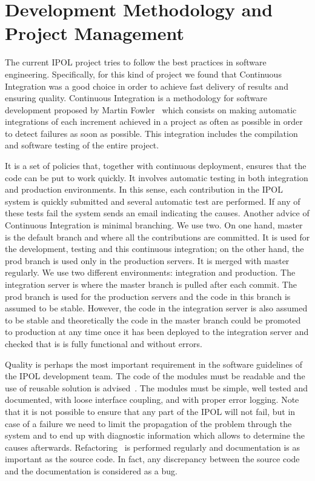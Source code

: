 
\section{Development Methodology and Project Management}
\label{sec:methodology}
The current IPOL project tries to follow the best practices in software engineering. Specifically, for this kind of project we found that Continuous Integration was a good choice in order to achieve fast delivery of results and ensuring quality. Continuous Integration is a methodology for software development proposed by Martin Fowler~\cite{fowler2006continuous} which consists on making automatic integrations of each increment achieved in a project as often as possible in order to detect failures as soon as possible. This integration includes the compilation and software testing of the entire project.

It is a set of policies that, together with continuous deployment, ensures that the code can be put to work quickly. It involves automatic testing in both integration and production environments. In this sense, each contribution in the IPOL system is quickly submitted and several automatic test are performed. If any of these tests fail the system sends an email indicating the causes.
%
Another advice of Continuous Integration is minimal branching. We use two. On one hand, master is the default branch and where all the contributions are committed. It is used for the development, testing and this continuous integration; on the other hand, the prod branch is used only in the production servers. It is merged with master regularly.
%
We use two different environments: integration and production. The integration server is where the master branch is pulled after each commit. The prod branch is used for the production servers and the code in this branch is assumed to be stable. However, the code in the integration server is also assumed to be stable and theoretically the code in the master branch could be promoted to production at any time once it has been deployed to the integration server and checked that is is fully functional and without errors. 

Quality is perhaps the most important requirement in the software guidelines of the IPOL development team. The code of the modules must be readable and the use of reusable solution is advised~\cite{GoF}. The modules must be simple, well tested and documented, with loose interface coupling, and with proper error logging. Note that it is not possible to ensure that any part of the IPOL will not fail, but in case of a failure we need to limit the propagation of the problem through the system and to end up with diagnostic information which allows to determine the causes afterwards.
%
Refactoring~\cite{fowler1999refactoring} is performed regularly and documentation is as important as the source code. In fact, any discrepancy between the source code and the documentation is considered as a bug.

